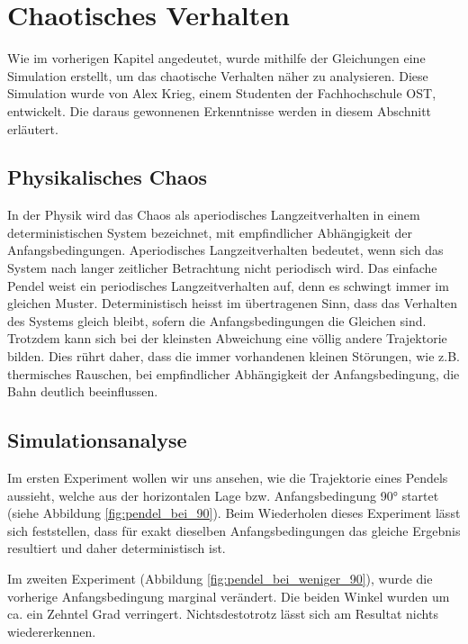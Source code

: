 \section{Chaotisches Verhalten}
Wie im vorherigen Kapitel angedeutet, wurde mithilfe der Gleichungen eine Simulation erstellt,
um das chaotische Verhalten näher zu analysieren.
Diese Simulation wurde von Alex Krieg, einem Studenten der Fachhochschule OST, entwickelt.
Die daraus gewonnenen Erkenntnisse werden in diesem Abschnitt erläutert.

\subsection{Physikalisches Chaos}
In der Physik wird das Chaos als aperiodisches Langzeitverhalten in einem deterministischen
System bezeichnet, mit empfindlicher Abhängigkeit der Anfangsbedingungen.
Aperiodisches Langzeitverhalten bedeutet, wenn sich das System nach langer zeitlicher Betrachtung
nicht periodisch wird.
Das einfache Pendel weist ein periodisches Langzeitverhalten auf,
denn es schwingt immer im gleichen Muster.
Deterministisch heisst im übertragenen Sinn, dass das Verhalten des Systems gleich bleibt,
sofern die Anfangsbedingungen die Gleichen sind.
Trotzdem kann sich bei der kleinsten Abweichung eine völlig andere Trajektorie bilden.
Dies rührt daher, dass die immer vorhandenen kleinen Störungen, wie z.B. thermisches Rauschen,
bei empfindlicher Abhängigkeit der Anfangsbedingung, die Bahn deutlich beeinflussen.

\subsection{Simulationsanalyse}
Im ersten Experiment wollen wir uns ansehen, wie die Trajektorie eines Pendels aussieht,
welche aus der horizontalen Lage bzw. Anfangsbedingung 90° startet
(siehe Abbildung \ref{fig:pendel_bei_90}).
Beim Wiederholen dieses Experiment lässt sich feststellen, dass für exakt dieselben Anfangsbedingungen
das gleiche Ergebnis resultiert und daher deterministisch ist.

Im zweiten Experiment (Abbildung \ref{fig:pendel_bei_weniger_90}), wurde die vorherige
Anfangsbedingung marginal verändert.
Die beiden Winkel wurden um ca. ein Zehntel Grad verringert.
Nichtsdestotrotz lässt sich am Resultat nichts wiedererkennen.

